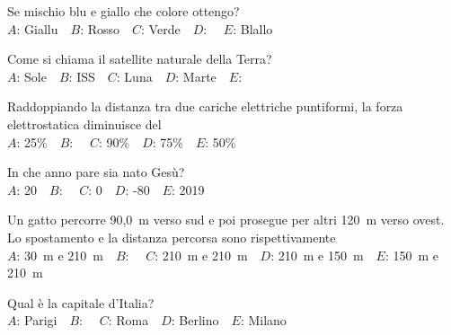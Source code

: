 \mcquestionheader Se mischio blu e giallo che colore ottengo?\\
{$A$}: Giallu\ \ {$B$}: Rosso\ \ {$C$}: Verde\ \ {$D$}: \ \ {$E$}: Blallo\ \ 

\mcquestionfooter



\def\mcquestionnumber{8}


\mcquestionheader Come si chiama il satellite naturale della Terra?\\
{$A$}: Sole\ \ {$B$}: ISS\ \ {$C$}: Luna\ \ {$D$}: Marte\ \ {$E$}: \ \ 

\mcquestionfooter



\def\mcquestionnumber{9}


\mcquestionheader Raddoppiando la distanza tra due cariche elettriche puntiformi, la forza elettrostatica diminuisce del\\
{$A$}: 25\%\ \ {$B$}: \ \ {$C$}: 90\%\ \ {$D$}: 75\%\ \ {$E$}: 50\%\ \ 

\mcquestionfooter



\def\mcquestionnumber{10}


\mcquestionheader In che anno pare sia nato Gesù?\\
{$A$}: 20\ \ {$B$}: \ \ {$C$}: 0\ \ {$D$}: -80\ \ {$E$}: 2019\ \ 

\mcquestionfooter



\def\mcquestionnumber{11}


\mcquestionheader Un gatto percorre 90,0~m verso sud e poi prosegue per altri 120~m verso ovest. Lo spostamento e la distanza percorsa sono rispettivamente\\
{$A$}: 30~m e 210~m\ \ {$B$}: \ \ {$C$}: 210~m e 210~m\ \ {$D$}: 210~m e 150~m\ \ {$E$}: 150~m e 210~m\ \ 

\mcquestionfooter



\def\mcquestionnumber{12}


\mcquestionheader Qual è la capitale d’Italia?\\
{$A$}: Parigi\ \ {$B$}: \ \ {$C$}: Roma\ \ {$D$}: Berlino\ \ {$E$}: Milano\ \ 

\mcquestionfooter



\mcpaperfooter

\def\mcserialnumber{21}
\mcpaperheader


\def\mcquestionnumber{1}


